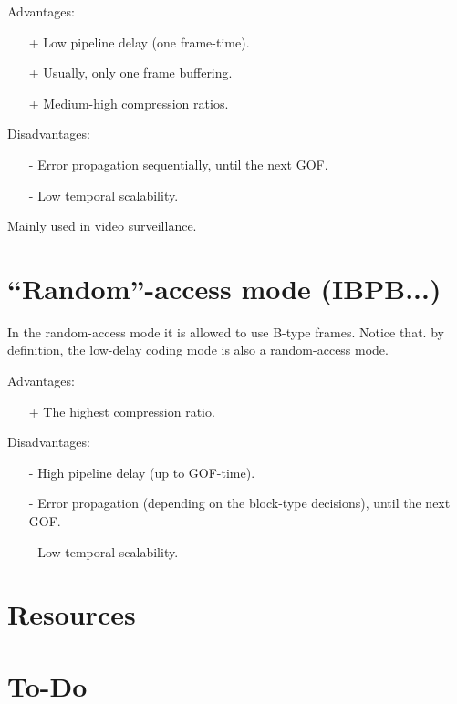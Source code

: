 Advantages:
\begin{itemize}
\item [+] Low pipeline delay (one frame-time).
\item [+] Usually, only one frame buffering.
\item [+] Medium-high compression ratios.
\end{itemize}

Disadvantages:
\begin{enumerate}
\item [-] Error propagation sequentially, until the next GOF.
\item [-] Low temporal scalability.
\end{enumerate}

Mainly used in video surveillance.

\section{``Random''-access mode (IBPB...)}
\label{sec:random}

In the random-access mode it is allowed to use B-type frames.
Notice that. by definition, the low-delay coding mode is also a
random-access mode.

Advantages:
\begin{itemize}
\item [+] The highest compression ratio.
\end{itemize}

Disadvantages:
\begin{enumerate}
\item [-] High pipeline delay (up to GOF-time).
\item [-] Error propagation (depending on the block-type decisions),
  until the next GOF.
\item [-] Low temporal scalability.
\end{enumerate}

\section{Resources}

\section{To-Do}

